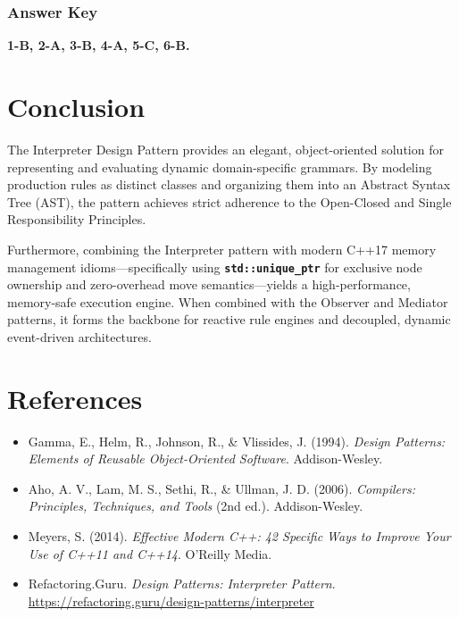 \documentclass[12pt,a4paper]{article}
\begin{document}
\subsubsection*{Answer Key}
\textbf{1-B, 2-A, 3-B, 4-A, 5-C, 6-B.}

\newpage
\section{Conclusion}
The Interpreter Design Pattern provides an elegant, object-oriented solution for representing and evaluating dynamic domain-specific grammars. By modeling production rules as distinct classes and organizing them into an Abstract Syntax Tree (AST), the pattern achieves strict adherence to the Open-Closed and Single Responsibility Principles. 

Furthermore, combining the Interpreter pattern with modern C++17 memory management idioms—specifically using \textbf{\texttt{std::unique\_ptr}} for exclusive node ownership and zero-overhead move semantics—yields a high-performance, memory-safe execution engine. When combined with the Observer and Mediator patterns, it forms the backbone for reactive rule engines and decoupled, dynamic event-driven architectures.

\newpage

\section*{References}
\begin{itemize}
    \item Gamma, E., Helm, R., Johnson, R., \& Vlissides, J. (1994). \textit{Design Patterns: Elements of Reusable Object-Oriented Software}. Addison-Wesley.
    \item Aho, A. V., Lam, M. S., Sethi, R., \& Ullman, J. D. (2006). \textit{Compilers: Principles, Techniques, and Tools} (2nd ed.). Addison-Wesley.
    \item Meyers, S. (2014). \textit{Effective Modern C++: 42 Specific Ways to Improve Your Use of C++11 and C++14}. O'Reilly Media.
    \item Refactoring.Guru. \textit{Design Patterns: Interpreter Pattern}. \url{https://refactoring.guru/design-patterns/interpreter}
\end{itemize}
\end{document}
